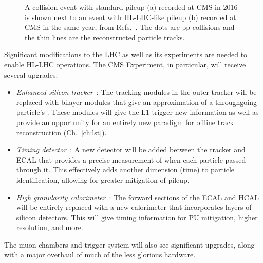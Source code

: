 \begin{figure}[!htb]
    \centering
    \qquad
    \caption{
        A collision event with standard pileup (a) recorded at CMS in 2016 is shown next to an event with HL-LHC-like pileup (b) recorded at CMS in the same year, from Refs.~\cite{NormalPU2016, HighPU2016}.
        The dots are pp collisions and the thin lines are the reconstructed particle tracks.
    }
    \label{fig:pileup}
\end{figure}

Significant modifications to the LHC as well as its experiments are needed to enable HL-LHC operations. 
The CMS Experiment, in particular, will receive several upgrades: 
\begin{itemize}
    \item{
        \textit{Enhanced silicon tracker}~\cite{CERN-LHCC-2017-009}: 
        The tracking modules in the outer tracker will be replaced with bilayer modules that give an approximation of a throughgoing particle's \pt. 
        These modules will give the L1 trigger new information as well as provide an opportunity for an entirely new paradigm for offline track reconstruction (Ch.~\ref{ch:lst}). 
    }
    \item{
        \textit{Timing detector}~\cite{CERN-LHCC-2017-027}: 
        A new detector will be added between the tracker and ECAL that provides a precise measurement of when each particle passed through it. 
        This effectively adds another dimension (time) to particle identification, allowing for greater mitigation of pileup. 
    }
    \item{
            \textit{High granularity calorimeter}~\cite{CERN-LHCC-2017-023, CERN-LHCC-2017-011}: 
        The forward sections of the ECAL and HCAL will be entirely replaced with a new calorimeter that incorporates layers of silicon detectors. 
        This will give timing information for PU mitigation, higher resolution, and more. 
    }
\end{itemize}
The muon chambers and trigger system will also see significant upgrades, along with a major overhaul of much of the less glorious hardware.

